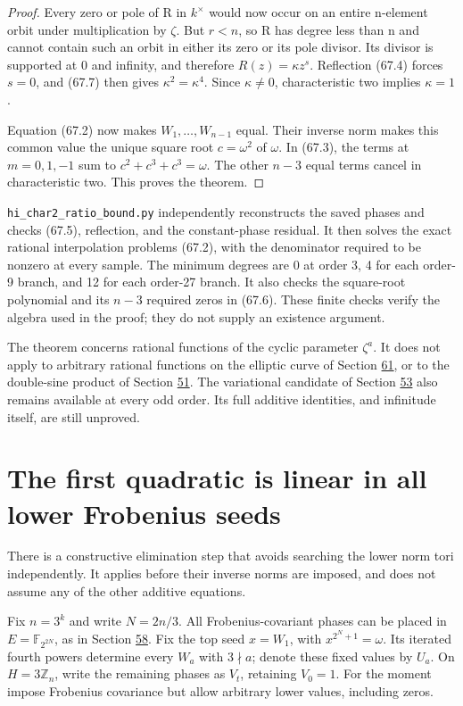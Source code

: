 \documentclass[11pt,reqno]{amsart}
\theoremstyle{plain}
\begin{document}
\begin{proof}
Every zero or pole of R in \(k^\times\) would now occur on an
entire n-element orbit under multiplication by \(\zeta\). But
\(r<n\), so R has degree less than n and cannot contain such an
orbit in either its zero or its pole divisor. Its divisor is supported
at 0 and infinity, and therefore \(R(z)=\kappa z^s\). Reflection
(67.4) forces \(s=0\), and (67.7) then gives
\(\kappa^2=\kappa^4\). Since \(\kappa\ne0\), characteristic two
implies \(\kappa=1\).

Equation (67.2) now makes \(W_1,\ldots,W_{n-1}\) equal. Their
inverse norm makes this common value the unique square root
\(c=\omega^2\) of \(\omega\). In (67.3), the terms at
\(m=0,1,-1\) sum to \(c^2+c^3+c^3=\omega\). The other
\(n-3\) equal terms cancel in characteristic two. This proves the
theorem.
\end{proof}

\texttt{hi\_\allowbreak char2\_\allowbreak ratio\_\allowbreak bound.py} independently reconstructs the saved phases
and checks (67.5), reflection, and the constant-phase residual. It
then solves the exact rational interpolation problems (67.2), with
the denominator required to be nonzero at every sample. The minimum
degrees are 0 at order 3, 4 for each order-9 branch, and 12 for each
order-27 branch. It also checks the square-root polynomial and its
\(n-3\) required zeros in (67.6). These finite checks verify the
algebra used in the proof; they do not supply an existence argument.

The theorem concerns rational functions of the cyclic parameter
\(\zeta^a\). It does not apply to arbitrary rational functions on
the elliptic curve of Section \hyperref[sec:61]{61}, or to the double-sine product of
Section \hyperref[sec:51]{51}. The variational candidate of Section \hyperref[sec:53]{53} also remains
available at every odd order. Its full additive identities, and
infinitude itself, are still unproved.

\section{The first quadratic is linear in all lower Frobenius seeds}\label{sec:68}

There is a constructive elimination step that avoids searching the
lower norm tori independently. It applies before their inverse norms
are imposed, and does not assume any of the other additive equations.

Fix \(n=3^k\) and write \(N=2n/3\). All Frobenius-covariant phases
can be placed in \(E=\mathbb F_{2^{2N}}\), as in Section \hyperref[sec:58]{58}. Fix the
top seed \(x=W_1\), with
\(x^{2^N+1}=\omega\). Its iterated fourth powers determine every
\(W_a\) with \(3\nmid a\); denote these fixed values by \(U_a\).
On \(H=3\mathbb Z_n\), write the remaining phases as \(V_t\),
retaining \(V_0=1\). For the moment impose Frobenius covariance but
allow arbitrary lower values, including zeros.
\end{document}
